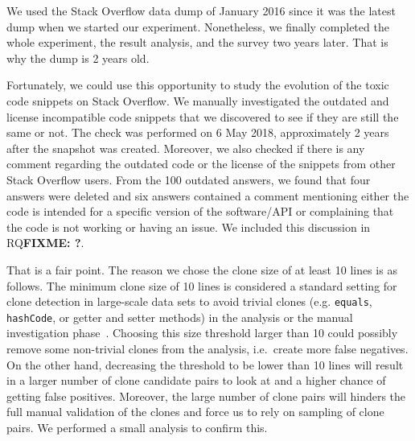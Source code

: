 \documentclass[a4paper,twoside,10pt]{reviewresponse}
\newcommand\FIXME[1]{{\color{red}\textbf{FIXME: #1}}}
\begin{document}

We used the Stack Overflow data dump of January 2016 since it was the latest dump when we started our experiment. Nonetheless, we finally completed the whole experiment, the result analysis, and the survey two years later. That is why the dump is 2 years old.

Fortunately, we could use this opportunity to study the evolution of the toxic code snippets on Stack Overflow. We manually investigated the outdated and license incompatible code snippets that we discovered to see if they are still the same or not. The check was performed on 6 May 2018, approximately 2 years after the snapshot was created. Moreover, we also checked if there is any comment regarding the outdated code or the license of the snippets from other Stack Overflow users. From the 100 outdated answers, we found that four answers were deleted and six answers contained a comment mentioning either the code is intended for a specific version of the software/API or complaining that the code is not working or having an issue. 
We included this discussion in RQ\FIXME{?}.


That is a fair point. The reason we chose the clone size of at least 10 lines is as follows. The minimum clone size of 10 lines is considered a standard setting for clone detection in large-scale data sets to avoid trivial clones (e.g. \texttt{equals}, \texttt{hashCode}, or getter and setter methods) in the analysis or the manual investigation phase~\citep{Sajnani2016}. 
Choosing this size threshold larger than 10 could possibly remove some non-trivial clones from the analysis, i.e.~create more false negatives.
On the other hand, decreasing the threshold to be lower than 10 lines will result in a larger number of clone candidate pairs to look at and a higher chance of getting false positives. Moreover, the large number of clone pairs will hinders the full manual validation of the clones and force us to rely on sampling of clone pairs. We performed a small analysis to confirm this.
\end{document}
